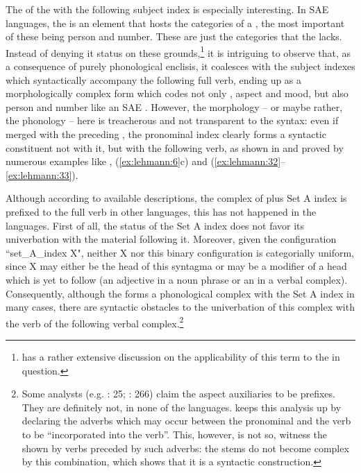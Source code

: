 \documentclass[output=paper]{langsci/langscibook}
\begin{document}
The  of the  with the following  subject index is especially interesting. In SAE languages, the  is an element that hosts the  categories of a , the most important of these being person and number. These are just the categories that the   lacks. Instead of denying it  status on these grounds,\footnote{\citet[§4.13]{Andrade1955} has a rather extensive discussion on the applicability of this term to the  in question.} it is intriguing to observe that, as a consequence of purely phonological enclisis, it coalesces with the subject indexes which syntactically accompany the following full verb, ending up as a morphologically complex form which codes not only , aspect and mood, but also person and number like an SAE . However, the morphology – or maybe rather, the phonology – here is treacherous and not transparent to the syntax: even if merged with the preceding , the pronominal index clearly forms a syntactic constituent not with it, but with the following verb, as shown in  and proved by numerous examples like , (\ref{ex:lehmann:6}c) and (\ref{ex:lehmann:32}–\ref{ex:lehmann:33}).

Although according to available descriptions, the complex of  plus Set A index is prefixed to the full verb in other  languages, this has not happened in the  languages. First of all, the  status of the Set A index does not favor its univerbation with the material following it. Moreover, given the configuration “set\_A\_index X", neither X nor this binary configuration is categorially uniform, since X may either be the head of this syntagma or may be a modifier of a head which is yet to follow (an adjective in a noun phrase or an  in a verbal complex). Consequently, although the  forms a phonological complex with the Set A index in many cases, there are syntactic obstacles to the univerbation of this complex with the verb of the following verbal complex.\footnote{Some analysts (e.g. \citealt{Hofling1991}: 25; \citealt{Pye2009}: 266) claim the aspect auxiliaries to be prefixes. They are definitely not, in none of the  languages. \citet[37]{Hofling1991} keeps this analysis up by declaring the adverbs which may occur between the pronominal  and the verb to be “incorporated into the verb”. This, however, is not so, witness the  shown by verbs preceded by such adverbs: the stems do not become complex by this combination, which shows that it is a syntactic construction.}
\end{document}
